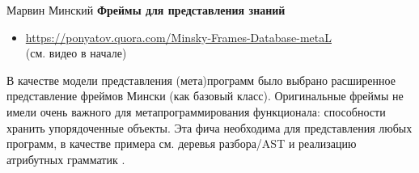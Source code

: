 \label{frame}\secdown


\cite{minsky} Марвин Минский \textbf{Фреймы для представления знаний}
\bigskip

\begin{itemize}
  \item 
\url{https://ponyatov.quora.com/Minsky-Frames-Database-metaL}\\(см. видео в
начале)
\end{itemize}

В качестве модели представления (мета)программ было выбрано расширенное
представление фреймов Мински (как базовый класс). Оригинальные фреймы не имели
очень важного для метапрограммирования функционала: способности хранить
упорядоченные объекты. Эта фича необходима для представления любых
программ, в
качестве примера см. деревья разбора/AST и реализацию атрибутных грамматик
\cite{dragon2}.

% 
% 
% 
% 
% 
% 
% 
%   

\secup
